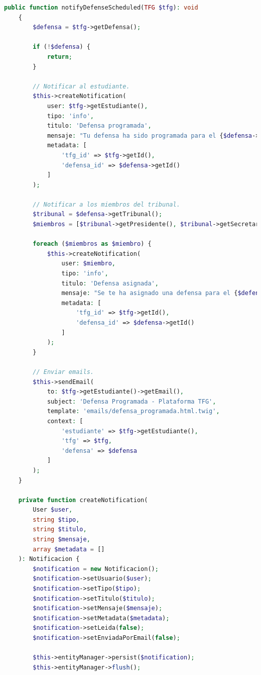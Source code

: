 \documentclass[12pt,a4paper,oneside]{report}
\begin{document}
\begin{lstlisting}[language=PHP]
    public function notifyDefenseScheduled(TFG $tfg): void
    {
        $defensa = $tfg->getDefensa();
        
        if (!$defensa) {
            return;
        }

        // Notificar al estudiante.
        $this->createNotification(
            user: $tfg->getEstudiante(),
            tipo: 'info',
            titulo: 'Defensa programada',
            mensaje: "Tu defensa ha sido programada para el {$defensa->getFechaDefensa()->format('d/m/Y H:i')}",
            metadata: [
                'tfg_id' => $tfg->getId(),
                'defensa_id' => $defensa->getId()
            ]
        );

        // Notificar a los miembros del tribunal.
        $tribunal = $defensa->getTribunal();
        $miembros = [$tribunal->getPresidente(), $tribunal->getSecretario(), $tribunal->getVocal()];

        foreach ($miembros as $miembro) {
            $this->createNotification(
                user: $miembro,
                tipo: 'info',
                titulo: 'Defensa asignada',
                mensaje: "Se te ha asignado una defensa para el {$defensa->getFechaDefensa()->format('d/m/Y H:i')}",
                metadata: [
                    'tfg_id' => $tfg->getId(),
                    'defensa_id' => $defensa->getId()
                ]
            );
        }

        // Enviar emails.
        $this->sendEmail(
            to: $tfg->getEstudiante()->getEmail(),
            subject: 'Defensa Programada - Plataforma TFG',
            template: 'emails/defensa_programada.html.twig',
            context: [
                'estudiante' => $tfg->getEstudiante(),
                'tfg' => $tfg,
                'defensa' => $defensa
            ]
        );
    }

    private function createNotification(
        User $user,
        string $tipo,
        string $titulo,
        string $mensaje,
        array $metadata = []
    ): Notificacion {
        $notification = new Notificacion();
        $notification->setUsuario($user);
        $notification->setTipo($tipo);
        $notification->setTitulo($titulo);
        $notification->setMensaje($mensaje);
        $notification->setMetadata($metadata);
        $notification->setLeida(false);
        $notification->setEnviadaPorEmail(false);

        $this->entityManager->persist($notification);
        $this->entityManager->flush();


\end{lstlisting}
\end{document}
